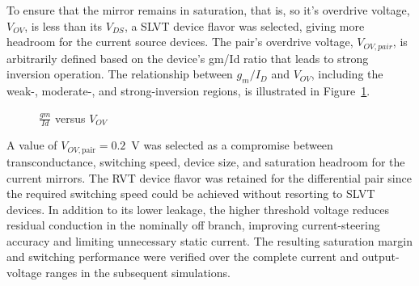To ensure that the mirror remains in saturation, that is, so it's overdrive voltage, $V_{OV}$, is less than its $V_{DS}$, a \ac{SLVT} device flavor was selected, giving more headroom for the current source devices. The pair's overdrive voltage, $V_{OV,pair}$, is arbitrarily defined based on the device's gm/Id ratio that leads to strong inversion operation. The relationship between $g_m/I_D$ and $V_{OV}$, including the weak-, moderate-, and strong-inversion regions, is illustrated in Figure~\ref{fig:gmid_vs_vov}. 

\begin{figure}[H]
	\centering
	\caption{$\frac{gm}{Id}$ versus $V_{OV}$}\label{fig:gmid_vs_vov}
\end{figure}


A value of $V_{OV,\mathrm{pair}}=0.2$~V was selected as a compromise between transconductance, switching speed, device size, and saturation headroom for the current mirrors. The \ac{RVT} device flavor was retained for the differential pair since the required switching speed could be achieved without resorting to \ac{SLVT} devices. In addition to its lower leakage, the higher threshold voltage reduces residual conduction in the nominally off branch, improving current-steering accuracy and limiting unnecessary static current. The resulting saturation margin and switching performance were verified over the complete current and output-voltage ranges in the subsequent simulations.

